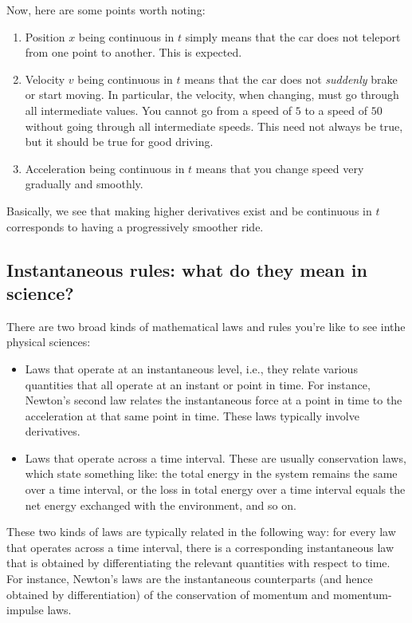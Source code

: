 Now, here are some points worth noting:

\begin{enumerate}
\item Position $x$ being continuous in $t$ simply means that the car
  does not teleport from one point to another. This is expected.
\item Velocity $v$ being continuous in $t$ means that the car does not
  {\em suddenly} brake or start moving. In particular, the velocity,
  when changing, must go through all intermediate values. You cannot
  go from a speed of $5$ to a speed of $50$ without going through all
  intermediate speeds. This need not always be true, but it should be
  true for good driving.
\item Acceleration being continuous in $t$ means that you change speed
  very gradually and smoothly.
\end{enumerate}

Basically, we see that making higher derivatives exist and be
continuous in $t$ corresponds to having a progressively smoother ride.

\subsection{Instantaneous rules: what do they mean in science?}

There are two broad kinds of mathematical laws and rules you're like
to see inthe physical sciences:

\begin{itemize}
\item Laws that operate at an instantaneous level, i.e., they relate
  various quantities that all operate at an instant or point in
  time. For instance, Newton's second law relates the instantaneous
  force at a point in time to the acceleration at that same point in
  time. These laws typically involve derivatives.
\item Laws that operate across a time interval. These are usually
  conservation laws, which state something like: the total energy in
  the system remains the same over a time interval, or the loss in
  total energy over a time interval equals the net energy exchanged
  with the environment, and so on.
\end{itemize}

These two kinds of laws are typically related in the following way:
for every law that operates across a time interval, there is a
corresponding instantaneous law that is obtained by differentiating
the relevant quantities with respect to time. For instance, Newton's
laws are the instantaneous counterparts (and hence obtained by
differentiation) of the conservation of momentum and momentum-impulse
laws.

